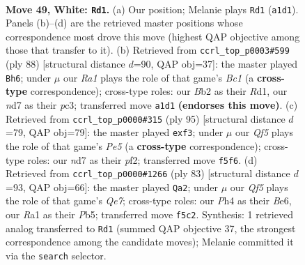 \documentclass[11pt]{article}
\begin{document}
\clearpage

\begin{figure}[p]\centering
\begin{subfigure}{0.46\textwidth}\centering
\resizebox{\linewidth}{!}{%
\newchessgame
\chessboard[
  setfen={3q2k1/1b1n1p2/3P1n2/2p2Q2/p6P/5pP1/PB5K/R7 w - - 11 49},
  showmover=false,
  pgfstyle=straightmove, color=movearrow, markmove={a1-d1}
]}
\caption{}
\end{subfigure}\hfill
\begin{subfigure}{0.46\textwidth}\centering
\resizebox{\linewidth}{!}{%
\newchessgame
\chessboard[
  setfen={3r3k/6pp/8/p1qnQP2/8/2p4P/P4PK1/2BR4 w - - 1 45},
  showmover=false,
  pgfstyle=straightmove, color=movearrow, markmove={c1-h6}
]}
\caption{}
\end{subfigure}
\\[4pt]
\begin{subfigure}{0.46\textwidth}\centering
\resizebox{\linewidth}{!}{%
\newchessgame
\chessboard[
  setfen={5bk1/7p/3p4/3P3p/3Qpp2/2B2N2/r3qPP1/4N1K1 b - - 1 48},
  showmover=false,
  pgfstyle=straightmove, color=movearrow, markmove={e4-f3}
]}
\caption{}
\end{subfigure}\hfill
\begin{subfigure}{0.46\textwidth}\centering
\resizebox{\linewidth}{!}{%
\newchessgame
\chessboard[
  setfen={6k1/5pp1/4b3/1p4bp/1P2P3/2Q1NP2/4qBPP/6K1 b - - 16 42},
  showmover=false,
  pgfstyle=straightmove, color=movearrow, markmove={e2-a2}
]}
\caption{}
\end{subfigure}
\caption{\textbf{Move 49, White: \texttt{Rd1}.} (a) Our position; Melanie plays \texttt{Rd1} (\texttt{a1d1}). Panels (b)--(d) are the retrieved master positions whose correspondence most drove this move (highest QAP objective among those that transfer to it). (b) Retrieved from \texttt{ccrl\_top\_p0003\#599} (ply 88) [structural distance $d$=90, QAP obj=37]: the master played \texttt{Bh6}; under $\mu$ our \emph{Ra1} plays the role of that game's \emph{Bc1} (a \textbf{cross-type} correspondence); cross-type roles: our \emph{B}b2 as their \emph{R}d1, our \emph{n}d7 as their \emph{p}c3; transferred move \texttt{a1d1} \textbf{(endorses this move)}. (c) Retrieved from \texttt{ccrl\_top\_p0000\#315} (ply 95) [structural distance $d$=79, QAP obj=79]: the master played \texttt{exf3}; under $\mu$ our \emph{Qf5} plays the role of that game's \emph{Pe5} (a \textbf{cross-type} correspondence); cross-type roles: our \emph{n}d7 as their \emph{p}f2; transferred move \texttt{f5f6}. (d) Retrieved from \texttt{ccrl\_top\_p0000\#1266} (ply 83) [structural distance $d$=93, QAP obj=66]: the master played \texttt{Qa2}; under $\mu$ our \emph{Qf5} plays the role of that game's \emph{Qe7}; cross-type roles: our \emph{P}h4 as their \emph{B}e6, our \emph{R}a1 as their \emph{P}b5; transferred move \texttt{f5c2}. Synthesis: 1 retrieved analog transferred to \texttt{Rd1} (summed QAP objective 37, the strongest correspondence among the candidate moves); Melanie committed it via the \texttt{search} selector.}
\label{fig:thought-m96}
\end{figure}
\end{document}
